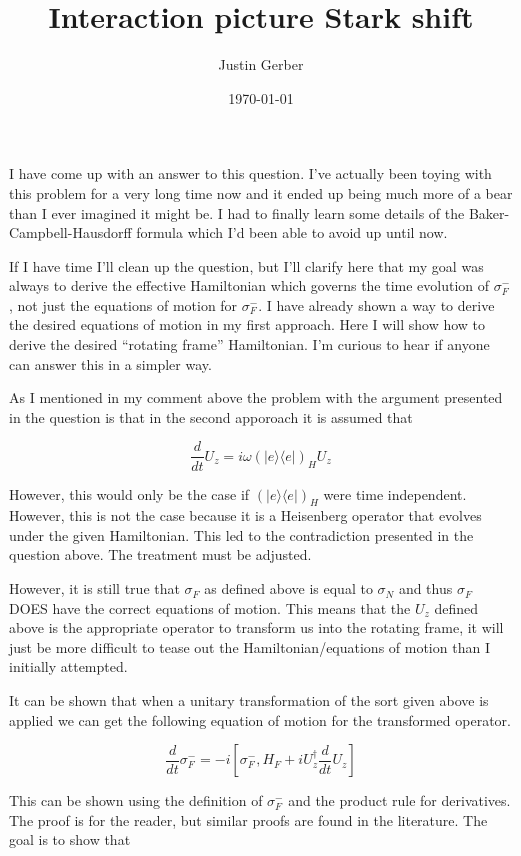 \documentclass[12pt]{article}
\begin{document}
\title{Interaction picture Stark shift}
\author{Justin Gerber}
\date{\today}
\maketitle


I have come up with an answer to this question. I've actually been toying with this problem for a very long time now and it ended up being much more of a bear than I ever imagined it might be. I had to finally learn some details of the Baker-Campbell-Hausdorff formula which I'd been able to avoid up until now.

If I have time I'll clean up the question, but I'll clarify here that my goal was always to derive the effective Hamiltonian which governs the time evolution of $\sigma^-_F$, not just the equations of motion for $\sigma^-_F$. I have already shown a way to derive the desired equations of motion in my first approach. Here I will show how to derive the desired ``rotating frame'' Hamiltonian. I'm curious to hear if anyone can answer this in a simpler way.

As I mentioned in my comment above the problem with the argument presented in the question is that in the second apporoach it is assumed that

$$
\frac{d}{dt} U_z = i\omega (|e \rangle \langle e|)_H U_z
$$

However, this would only be the case if $(|e \rangle \langle e|)_H$ were time independent. However, this is not the case because it is a Heisenberg operator that evolves under the given Hamiltonian. This led to the contradiction presented in the question above. The treatment must be adjusted.

However, it is still true that $\sigma_F$ as defined above is equal to $\sigma_N$ and thus $\sigma_F$ DOES have the correct equations of motion. This means that the $U_z$ defined above is the appropriate operator to transform us into the rotating frame, it will just be more difficult to tease out the Hamiltonian/equations of motion than I initially attempted.

It can be shown that when a unitary transformation of the sort given above is applied we can get the following equation of motion for the transformed operator.

$$
\frac{d}{dt} \sigma^-_F = -i \left[\sigma^-_F, H_F + i U^{\dagger}_z \frac{d}{dt}U_z\right]
$$

This can be shown using the definition of $\sigma_F^-$ and the product rule for derivatives. The proof is for the reader, but similar proofs are found in the literature. The goal is to show that
\end{document}
